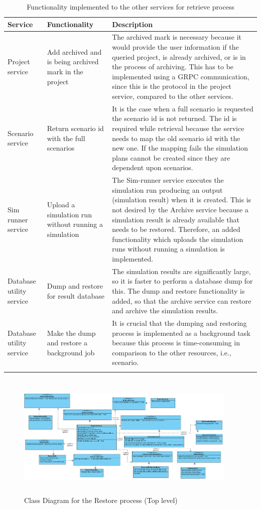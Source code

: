     \begin{longtable}{|p{2cm}|p{6cm}|p{6cm}|}
        \hline
            \textbf{Service}  & \textbf{Functionality} & \textbf{Description}\\
        \hline
            Project service & Add archived and is being archived mark in the project &  The archived mark is necessary because
            it would provide the user information if the queried project, is already archived, or is in the process of archiving. This has to be
            implemented using a GRPC communication, since this is the protocol in the project service, compared to the other services.  \\
        \hline
            Scenario service & Return scenario id with the full scenarios & It is the case when a full scenario is requested the scenario id is
            not returned. The id is required while retrieval because the service needs to map the old scenario id with the new one. If the mapping
            fails the simulation plans cannot be created since they are dependent upon scenarios.\\
        \hline
            Sim runner service & Upload a simulation run without running a simulation & The Sim-runner service executes the simulation run producing an
            output (simulation result) when it is created. This is not desired by the Archive service because a simulation result is already available that needs to be restored.
            Therefore, an added 
            functionality which uploads the simulation runs without running a simulation is implemented.\\
        \hline
            Database utility service & Dump and restore for result database & The simulation results are significantly large, so it is faster to
            perform a database dump for this. The dump and restore functionality is added, so that the archive service can restore and archive the simulation results.\\
        \hline
            Database utility service & Make the dump and restore a background job & It is crucial that the dumping and restoring process is implemented as a background task
            because this process is time-consuming in comparison to the other resources, i.e., scenario.\\

        \hline
        \caption{Functionality implemented to the other services for retrieve process}
        \label{table:funcRestore} 
    \end{longtable}

\begin{figure}[H]
    \centering \includegraphics[height=6cm, angle=90, origin=c, width=10.5cm]{grafiken/restoreClass.png}
    \caption{Class Diagram for the Restore process (Top level)}
    \label{fig:restoreClass}
\end{figure}
